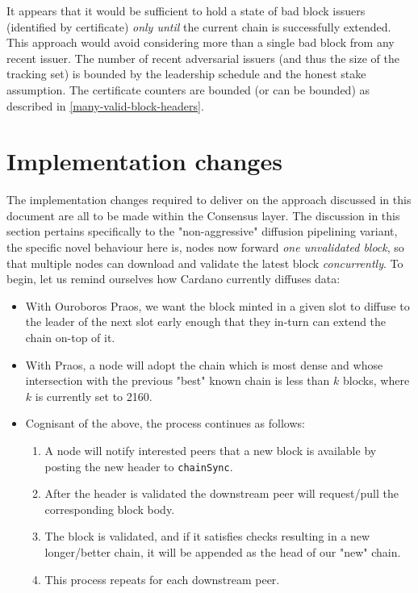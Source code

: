 \documentclass[11pt,a4paper]{article}
\begin{document}
It appears that it would be sufficient to hold a state of bad block issuers
(identified by certificate) \emph{only until} the current chain is successfully
extended. This approach would avoid considering more than a single bad block from any
recent issuer. The number of recent adversarial issuers (and thus the size of
the tracking set) is bounded by the leadership schedule and the honest stake
assumption. The certificate counters are bounded (or can be bounded) as
described in \cref{many-valid-block-headers}.

\pagebreak

\section{Implementation changes}
The implementation changes required to deliver on the approach discussed in this document
are all to be made within the Consensus layer. The discussion in this section pertains specifically 
to the "non-aggressive" diffusion pipelining variant, the specific novel behaviour here is, nodes now
forward \emph{one unvalidated block}, so that multiple nodes can download and validate the latest 
block \emph{concurrently}. To begin, let us remind ourselves how Cardano currently diffuses data:

\begin{itemize}
  \item With Ouroboros Praos, we want the block minted in a given slot to diffuse to the leader of the next slot early enough that they in-turn can extend the chain on-top of it.
  \item With Praos, a node will adopt the chain which is most dense and whose intersection with the previous "best" known chain is less than $k$ blocks, where $k$ is currently set to 2160.
  \item Cognisant of the above, the process continues as follows:
  \begin{enumerate}
    \item A node will notify interested peers that a new block is available by posting the new header to \lstinline{chainSync}. 
    \item After the header is validated the downstream peer will request/pull the corresponding block body.
    \item The block is validated, and if it satisfies checks resulting in a new longer/better chain, it will be appended as the head of our "new" chain.
    \item This process repeats for each downstream peer.
  \end{enumerate}
\end{itemize}
\end{document}
